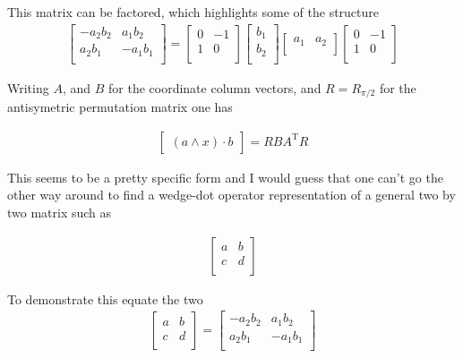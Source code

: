 \documentclass{article}
\newcommand{\T}[0]{{\text{T}}}
\begin{document}
This matrix can be factored, which highlights some of the structure
\begin{align}\label{eqn:matrixOfOperator}
\begin{bmatrix}
- a_2 b_2 & a_1 b_2  \\
a_2 b_1 & -a_1 b_1 \\
\end{bmatrix}
=
\begin{bmatrix}
0 & -1 \\
1 & 0 \\
\end{bmatrix}
\begin{bmatrix}
b_1 \\
b_2 \\
\end{bmatrix}
\begin{bmatrix}
a_1 & a_2 \\
\end{bmatrix}
\begin{bmatrix}
0 & -1 \\
1 & 0 \\
\end{bmatrix}
\end{align}

Writing $A$, and $B$ for the coordinate column vectors, and $R = R_{\pi/2}$ for the antisymetric permutation matrix one has 

\begin{align*}
\begin{bmatrix}
(a \wedge x) \cdot b
\end{bmatrix}
=
R B A^\T R
\end{align*}

This seems to be a pretty specific form and I would guess that one can't go the other way around to find a wedge-dot operator representation of a general two by two matrix such as

\begin{align*}
\begin{bmatrix}
a & b \\
c & d \\
\end{bmatrix}
\end{align*}

To demonstrate this equate the two
\begin{align*}
\begin{bmatrix}
a & b \\
c & d \\
\end{bmatrix}
=
\begin{bmatrix}
- a_2 b_2 & a_1 b_2  \\
a_2 b_1 & -a_1 b_1 \\
\end{bmatrix}
\end{align*}
\end{document}
